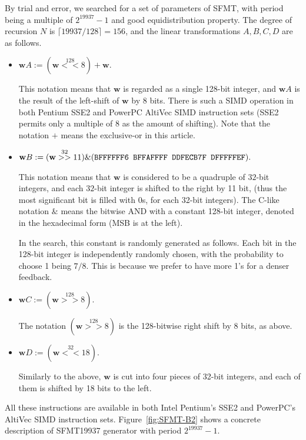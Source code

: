 \documentclass[acmnow]{acmtrans2m}
\def\bw{{{\mathbf w}}}
\begin{document}
By trial and error, 
we searched for a set of parameters of SFMT,
with period being a multiple of $2^{19937}-1$
and good equidistribution property.
The degree of recursion $N$ is $\lceil 19937/128 \rceil=156$, 
and the linear transformations $A,B,C,D$ are as follows.
\begin{itemize}
\item 
$\bw A := (\bw \stackrel{128}{<<} 8) + \bw.$

This notation means that $\bw$ is regarded
as a single 128-bit integer, and 
$\bw A$ is the result of the left-shift
of $\bw$ by 8 bits. There is such a SIMD operation
in both Pentium SSE2 and PowerPC AltiVec SIMD instruction 
sets (SSE2 permits only a multiple of 8
as the amount of shifting). 
Note that the notation $+$ means the exclusive-or
in this article.

\item
$\bw B := (\bw \stackrel{32}{>>} 11) \& (\mbox{\tt BFFFFFF6 BFFAFFFF DDFECB7F DFFFFFEF}).$

This notation means that $\bw$ is considered to be 
a quadruple of $32$-bit integers, and
each $32$-bit integer is shifted to the right by 11 bit,
(thus the most significant bit is filled with 0s, 
for each 32-bit integers).
The C-like notation $\&$ means the bitwise AND
with a constant 128-bit integer,
denoted in the hexadecimal form
(MSB is at the left). 

In the search,
this constant is randomly generated as follows. 
Each bit in the 128-bit integer is independently 
randomly chosen, with the probability to choose 1 being $7/8$.
This is because we prefer to have more 1's for a denser 
feedback.

\item 
$\bw C := (\bw \stackrel{128}{>>} 8).$

The notation 
$(\bw \stackrel{128}{>>} 8)$ is the 128-bitwise right shift 
by 8 bits, as above.

\item
$\bw D := (\bw \stackrel{32}{<<} 18).$

Similarly to the above,
$\bw$ is cut into four pieces of 32-bit integers,
and each of them is shifted by 18 bits to the left.
\end{itemize}
All these instructions are available in 
both Intel Pentium's SSE2 and PowerPC's AltiVec SIMD instruction sets.
Figure~\ref{fig:SFMT-B2} shows a concrete description
of SFMT19937 generator with period $2^{19937}-1$.
\end{document}
